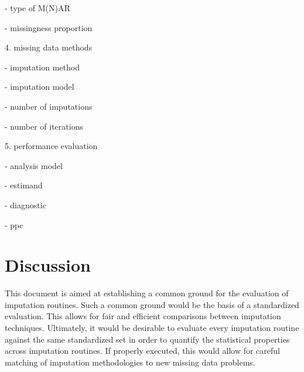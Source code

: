 \documentclass[bimj,fleqn]{w-art}
\theoremstyle{plain}
\theoremstyle{definition}
\begin{document}
- type of M(N)AR

- missingness proportion 

4. missing data methods

- imputation method

- imputation model

- number of imputations

- number of iterations

5. performance evaluation

- analysis model

- estimand

- diagnostic

- ppc



\section{Discussion}

This document is aimed at establishing a common ground for the evaluation of imputation routines. Such a common ground would be the basis of a standardized evaluation. This allows for fair and efficient comparisons between imputation techniques. Ultimately, it would be desirable to evaluate every imputation routine against the same standardized set in order to quantify the statistical properties across imputation routines. If properly executed, this would allow for careful matching of imputation methodologies to new missing data problems. 



\begin{acknowledgement}
\end{acknowledgement}
\vspace*{1pc}



% 
% 
\end{document}

